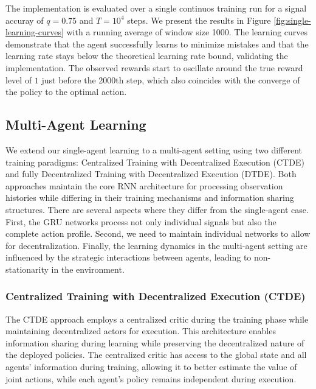 The implementation is evaluated over a single continuos training run for a signal accuray of $q=0.75$ and $T=10^4$ steps. We present the results in Figure \ref{fig:single-learning-curves} with a running average of window size 1000. The learning curves demonstrate that the agent successfully learns to minimize mistakes and that the learning rate stays below the theoretical learning rate bound, validating the implementation. The observed rewards start to oscillate around the true reward level of $1$ just before the 2000th step, which also coincides with the converge of the policy to the optimal action.


\subsection*{Multi-Agent Learning}

We extend our single-agent learning to a multi-agent setting using two different training paradigms: Centralized Training with Decentralized Execution (CTDE) and fully Decentralized Training with Decentralized Execution (DTDE). Both approaches maintain the core RNN architecture for processing observation histories while differing in their training mechanisms and information sharing structures. There are several aspects where they differ from the single-agent case. First, the GRU networks process not only individual signals but also the complete action profile. Second, we need to maintain individual networks to allow for decentralization. Finally, the learning dynamics in the multi-agent setting are influenced by the strategic interactions between agents, leading to non-stationarity in the environment.

\subsubsection*{Centralized Training with Decentralized Execution (CTDE)}

The CTDE approach employs a centralized critic during the training phase while maintaining decentralized actors for execution. This architecture enables information sharing during learning while preserving the decentralized nature of the deployed policies. The centralized critic has access to the global state and all agents' information during training, allowing it to better estimate the value of joint actions, while each agent's policy remains independent during execution.

